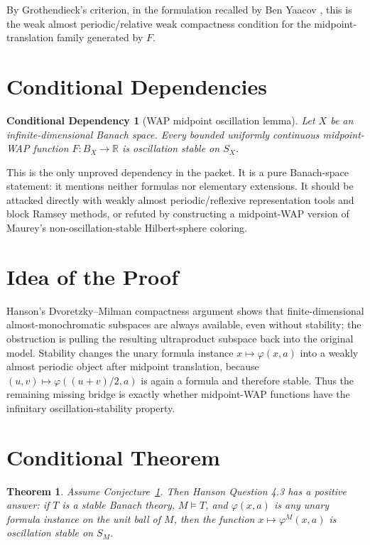 \documentclass[11pt]{article}
\newtheorem{theorem}{Theorem}
\newtheorem{conjecture}{Conditional Dependency}
\begin{document}
By Grothendieck's criterion, in the formulation recalled by Ben Yaacov
\cite{BenYaacov2014}, this is the weak almost periodic/relative weak
compactness condition for the midpoint-translation family generated by \(F\).

\section*{Conditional Dependencies}

\begin{conjecture}[WAP midpoint oscillation lemma]\label{conj:wap}
Let \(X\) be an infinite-dimensional Banach space.  Every bounded uniformly
continuous midpoint-WAP function \(F:B_X\to\mathbb R\) is oscillation stable on
\(S_X\).
\end{conjecture}

This is the only unproved dependency in the packet.  It is a pure Banach-space
statement: it mentions neither formulas nor elementary extensions.  It should
be attacked directly with weakly almost periodic/reflexive representation
tools and block Ramsey methods, or refuted by constructing a midpoint-WAP
version of Maurey's non-oscillation-stable Hilbert-sphere coloring.

\section*{Idea of the Proof}

Hanson's Dvoretzky--Milman compactness argument shows that finite-dimensional
almost-monochromatic subspaces are always available, even without stability;
the obstruction is pulling the resulting ultraproduct subspace back into the
original model.  Stability changes the unary formula instance \(x\mapsto
\varphi(x,a)\) into a weakly almost periodic object after midpoint
translation, because \((u,v)\mapsto\varphi((u+v)/2,a)\) is again a formula and
therefore stable.  Thus the remaining missing bridge is exactly whether
midpoint-WAP functions have the infinitary oscillation-stability property.

\section*{Conditional Theorem}

\begin{theorem}\label{thm:conditional}
Assume Conjecture~\ref{conj:wap}.  Then Hanson Question 4.3 has a positive
answer: if \(T\) is a stable Banach theory, \(M\models T\), and
\(\varphi(x,a)\) is any unary formula instance on the unit ball of \(M\), then
the function \(x\mapsto \varphi^M(x,a)\) is oscillation stable on \(S_M\).
\end{theorem}
\end{document}
